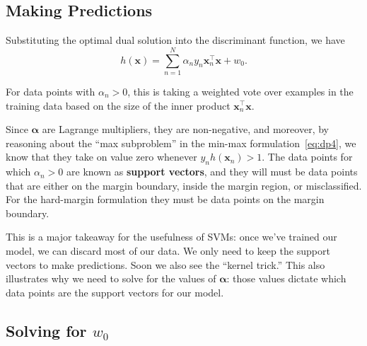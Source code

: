        

\subsection{Making Predictions}


Substituting the optimal dual solution into the discriminant function, we have
%
\begin{equation} \label{new-classification-fn}
	h(\textbf{x}) = \sum_{n=1}^{N} \alpha_{n} y_{n} \mathbf{x}_{n}^\top \mathbf{x} + w_{0}.
      \end{equation}

      For data points with $\alpha_n>0$, this is taking a weighted vote over examples in the training data based on the size of the inner product $\mathbf{x}^\top_n\mathbf{x}$.
      
Since $\boldsymbol{\alpha}$ are Lagrange multipliers, they are non-negative, and moreover, by reasoning about the ``max subproblem''
      in the min-max formulation~\eqref{eq:dp4}, we know that they take on value zero whenever $y_{n}
      h(\textbf{x}_{n}) > 1$.
%
%
      The data points for which $\alpha_{n} > 0$ are known as \textbf{support vectors}, and
they will  must be data points that are either  on the margin boundary, inside the margin region, or misclassified. For the hard-margin formulation they must be data points on the margin boundary.

This is a major takeaway for the usefulness of SVMs: once we've trained our model, we can discard most of our data. We only need to keep the support vectors to make predictions. Soon we also see the ``kernel trick.'' This also illustrates why we need to solve for the values of $\boldsymbol{\alpha}$: those values dictate which data points are the support vectors for our model.


\subsection*{Solving for $w_0$}

